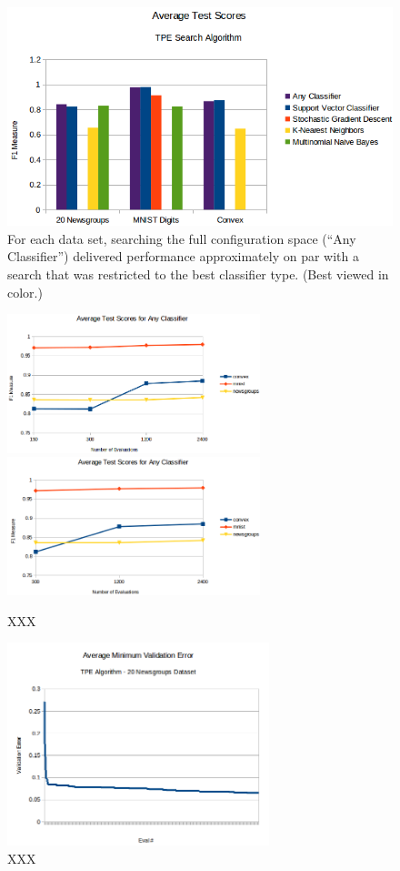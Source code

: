 \documentclass[wcp]{jmlr}
\begin{document}
\begin{figure}
    \centering
    \includegraphics[width=5.00in]{graphics/AverageTestScoresClassifiersTPE}
    \caption{
        For each data set, searching the full configuration space (``Any Classifier'') delivered performance approximately on par with a search that was restricted to the best classifier type.
        (Best viewed in color.)
    }
    \label{fig:avg_test_scores}
\end{figure}

\begin{figure}
    \centering
    \includegraphics[width=2.9in]{graphics/scores_by_classifier}
    \includegraphics[width=2.9in]{graphics/scores_per_eval}
    \caption{
	    XXX
    }
    \label{fig:per_clf}
\end{figure}

\begin{figure}
    \centering
    \includegraphics[width=3in]{graphics/AvgMinValidErrorTPE}
    \caption{
	    XXX
    }
    \label{fig:errtpe}
\end{figure}
\end{document}
